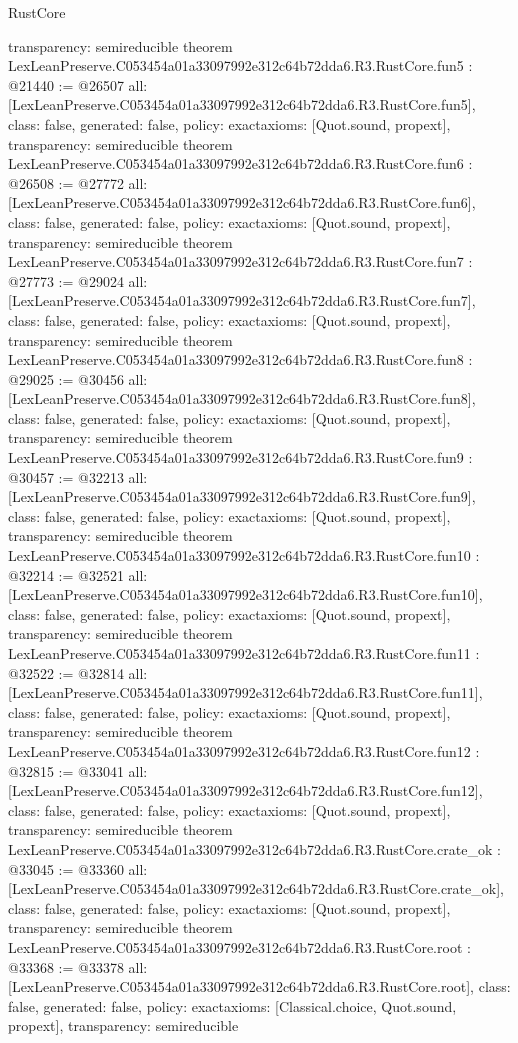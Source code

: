 \begin{lexlean}{RustCore}
\begin{coremodule}
{  transparency: semireducible
}
theorem LexLeanPreserve.C053454a01a33097992e312c64b72dda6.R3.RustCore.fun5 : @21440 := @26507 {
  all: [LexLeanPreserve.C053454a01a33097992e312c64b72dda6.R3.RustCore.fun5],
  class: false,
  generated: false,
  policy: exact{axioms: [Quot.sound, propext]},
  transparency: semireducible
}
theorem LexLeanPreserve.C053454a01a33097992e312c64b72dda6.R3.RustCore.fun6 : @26508 := @27772 {
  all: [LexLeanPreserve.C053454a01a33097992e312c64b72dda6.R3.RustCore.fun6],
  class: false,
  generated: false,
  policy: exact{axioms: [Quot.sound, propext]},
  transparency: semireducible
}
theorem LexLeanPreserve.C053454a01a33097992e312c64b72dda6.R3.RustCore.fun7 : @27773 := @29024 {
  all: [LexLeanPreserve.C053454a01a33097992e312c64b72dda6.R3.RustCore.fun7],
  class: false,
  generated: false,
  policy: exact{axioms: [Quot.sound, propext]},
  transparency: semireducible
}
theorem LexLeanPreserve.C053454a01a33097992e312c64b72dda6.R3.RustCore.fun8 : @29025 := @30456 {
  all: [LexLeanPreserve.C053454a01a33097992e312c64b72dda6.R3.RustCore.fun8],
  class: false,
  generated: false,
  policy: exact{axioms: [Quot.sound, propext]},
  transparency: semireducible
}
theorem LexLeanPreserve.C053454a01a33097992e312c64b72dda6.R3.RustCore.fun9 : @30457 := @32213 {
  all: [LexLeanPreserve.C053454a01a33097992e312c64b72dda6.R3.RustCore.fun9],
  class: false,
  generated: false,
  policy: exact{axioms: [Quot.sound, propext]},
  transparency: semireducible
}
theorem LexLeanPreserve.C053454a01a33097992e312c64b72dda6.R3.RustCore.fun10 : @32214 := @32521 {
  all: [LexLeanPreserve.C053454a01a33097992e312c64b72dda6.R3.RustCore.fun10],
  class: false,
  generated: false,
  policy: exact{axioms: [Quot.sound, propext]},
  transparency: semireducible
}
theorem LexLeanPreserve.C053454a01a33097992e312c64b72dda6.R3.RustCore.fun11 : @32522 := @32814 {
  all: [LexLeanPreserve.C053454a01a33097992e312c64b72dda6.R3.RustCore.fun11],
  class: false,
  generated: false,
  policy: exact{axioms: [Quot.sound, propext]},
  transparency: semireducible
}
theorem LexLeanPreserve.C053454a01a33097992e312c64b72dda6.R3.RustCore.fun12 : @32815 := @33041 {
  all: [LexLeanPreserve.C053454a01a33097992e312c64b72dda6.R3.RustCore.fun12],
  class: false,
  generated: false,
  policy: exact{axioms: [Quot.sound, propext]},
  transparency: semireducible
}
theorem LexLeanPreserve.C053454a01a33097992e312c64b72dda6.R3.RustCore.crate_ok : @33045 := @33360 {
  all: [LexLeanPreserve.C053454a01a33097992e312c64b72dda6.R3.RustCore.crate_ok],
  class: false,
  generated: false,
  policy: exact{axioms: [Quot.sound, propext]},
  transparency: semireducible
}
theorem LexLeanPreserve.C053454a01a33097992e312c64b72dda6.R3.RustCore.root : @33368 := @33378 {
  all: [LexLeanPreserve.C053454a01a33097992e312c64b72dda6.R3.RustCore.root],
  class: false,
  generated: false,
  policy: exact{axioms: [Classical.choice, Quot.sound, propext]},
  transparency: semireducible
}


\end{coremodule}
\end{lexlean}
